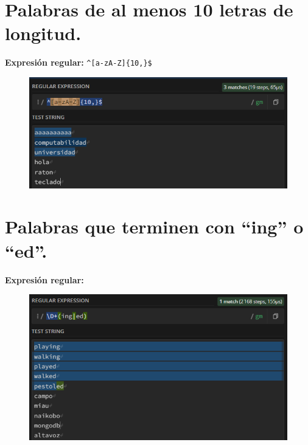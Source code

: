 \documentclass[11pt]{report}
\begin{document}
\section{Palabras de al menos 10 letras de longitud.}
\textbf{Expresión regular:} \verb|^[a-zA-Z]{10,}$|
  \begin{figure}[H]
    \centering
    \includegraphics[scale=0.75]{img/op_extendidos_09.png}
  \end{figure}

\section{Palabras que terminen con “ing” o “ed”.}
\textbf{Expresión regular:} 
  \begin{figure}[H]
    \centering
    \includegraphics[scale=0.75]{img/op_extendidos_10.png}
  \end{figure}
\end{document}
